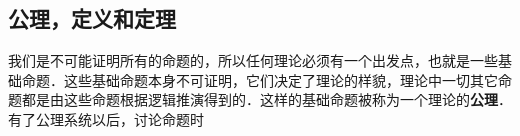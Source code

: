 \subsection{公理，定义和定理}
我们是不可能证明所有的命题的，所以任何理论必须有一个出发点，也就是一些基础命题．这些基础命题本身不可证明，它们决定了理论的样貌，理论中一切其它命题都是由这些命题根据逻辑推演得到的．这样的基础命题被称为一个理论的\textbf{公理}．
有了公理系统以后，讨论命题时
